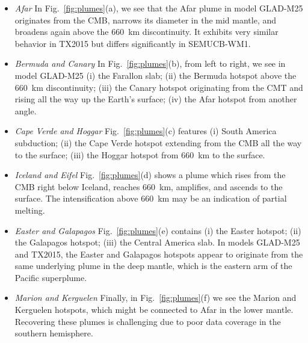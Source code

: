 \begin{itemize}
\item[]{\it Afar} In Fig.~\ref{fig:plumes}(a),
we see that the Afar plume in model GLAD-M25 originates from the CMB, narrows its diameter
in the mid mantle, and broadens again above the 660~km discontinuity.
It exhibits
very similar behavior in TX2015 but differs significantly in SEMUCB-WM1.  
\item[]{\it Bermuda and Canary} In Fig.~\ref{fig:plumes}(b), from left to right, we see in model GLAD-M25 (i) the Farallon
slab; (ii) the Bermuda hotspot above the 660~km discontinuity; (iii) the Canary hotspot originating from the CMT and
rising all the way up the Earth's surface; (iv) the Afar hotspot from another angle.
\item[]{\it Cape Verde and Hoggar} Fig.~\ref{fig:plumes}(c) features (i) South America subduction; (ii) the Cape Verde hotspot extending from the CMB all the way to the surface; (iii) the Hoggar hotspot from 660~km to the surface. 
\item[]{\it Iceland and Eifel} Fig.~\ref{fig:plumes}(d) shows a plume which rises from the CMB right below Iceland, reaches 660~km, amplifies,
and ascends to the surface.
The intensification above 660~km may be an indication of partial melting.
\item[]{\it Easter and Galapagos} Fig.~\ref{fig:plumes}(e) contains (i) the Easter hotspot; (ii) the Galapagos
hotspot; (iii) the Central America slab.
In models GLAD-M25 and TX2015,
the Easter and Galapagos hotspots appear to originate from the same underlying plume in the deep mantle,
which is the eastern arm of the Pacific superplume.
\item[]{\it Marion and Kerguelen}
Finally,
in Fig.~\ref{fig:plumes}(f) we see the Marion and Kerguelen hotspots, which might be connected to Afar in the lower mantle.
Recovering these plumes is challenging due to poor data coverage in the southern hemisphere.
\end{itemize}


